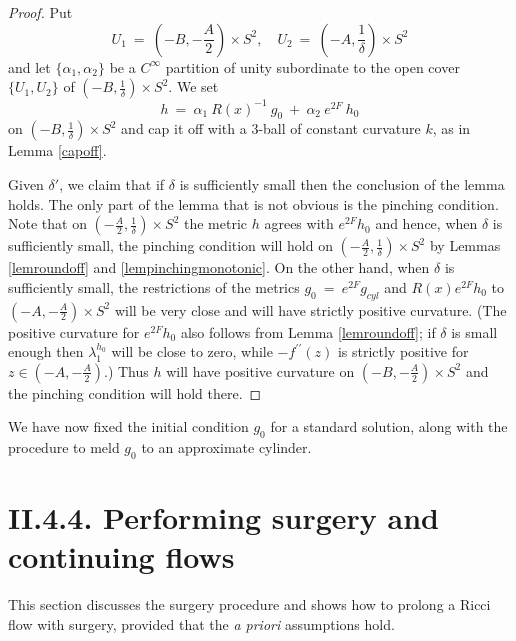 \documentclass[12pt]{amsart}
\newcommand{\al}{\alpha}
\newcommand{\de}{\delta}
\numberwithin{equation}{section}
\theoremstyle{plain}
\theoremstyle{definition}
\theoremstyle{remark}
\begin{document}
\begin{proof}
Put
\begin{equation}
U_1 \: = \:  (-B,-\frac{A}{2}) \times S^2,\quad U_2 \: = \:  (-A,\frac{1}{\de}) \times S^2
\end{equation}
and let $\{\al_1,\al_2\}$ be a $C^{\infty}$ partition of unity subordinate to the open
cover $\{U_1,U_2\}$ of $(-B,\frac{1}{\de}) \times S^2$.  We set
\begin{equation}
h \: = \:  \al_1 \: R(x)^{-1} \: g_{0} \: + \: \al_2 \: e^{2F} \: h_0
\end{equation}
on $\left( -B, \frac{1}{\delta} \right) \times S^2$ and cap it off with a
$3$-ball of constant curvature $k$, as in Lemma \ref{capoff}.


Given $\de'$, we claim that if $\de$ is sufficiently small then the conclusion of
the lemma holds.
The only part of the lemma that is not obvious is the pinching
condition.  Note that on $\left( -\frac{A}{2}, \frac{1}{\delta} \right) \times S^2$ the metric
$h$ agrees with $e^{2F}h_0$ and hence, when $\de$ is sufficiently
small, the pinching
condition will hold on $\left( -\frac{A}{2}, \frac{1}{\delta} \right) \times S^2$
by Lemmas \ref{lemroundoff} and \ref{lempinchingmonotonic}.
On the other hand, when $\de$ is sufficiently small, the 
restrictions of the metrics 
$g_{0} \: =\: e^{2F}g_{cyl}$
and $R(x)e^{2F}h_0$ to $(-A,- \frac{A}{2}) \times S^2$
will be very close and will have strictly positive
curvature. (The positive curvature for $e^{2F}h_0$ also follows from Lemma
\ref{lemroundoff}; if $\delta$ is small enough then $\lambda_1^{h_0}$ will be close
to zero, while $- f^{\prime \prime}(z)$ is strictly positive for
$z \in (-A,- \frac{A}{2})$.) Thus $h$ will have positive curvature on $(-B,- \frac{A}{2}) \times S^2$ 
and the pinching condition will hold there.
\end{proof}

We have now fixed the initial condition 
$g_{0}$
for a
standard solution, along with the procedure to meld 
$g_{0}$
to
an approximate cylinder.

\section{II.4.4. Performing surgery and continuing flows}
\label{II.4.4}
This section discusses the surgery procedure  and shows how to prolong a Ricci 
flow with surgery, provided that the {\it a priori} assumptions hold. 
\end{document}
